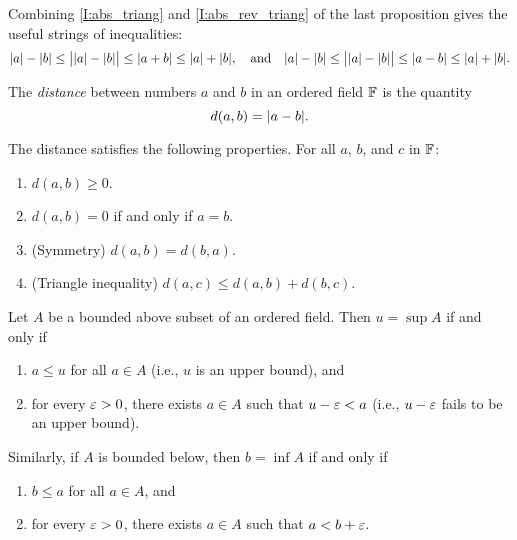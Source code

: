 \documentclass{book}
\begin{document}
\begin{rmk}
Combining \eqref{I:abs_triang} and \eqref{I:abs_rev_triang} of the last proposition gives the useful strings of inequalities:
\begin{equation}
	\lvert a\rvert - \lvert b\rvert \leq \big\lvert \lvert a\rvert - \lvert b\rvert\big\rvert \leq \lvert a + b\rvert \leq \lvert a\rvert + \lvert b\rvert, \quad \text{and}
	\quad \lvert a\rvert - \lvert b\rvert \leq \big\lvert \lvert a\rvert - \lvert b\rvert\big\rvert \leq \lvert a - b\rvert \leq \lvert a\rvert + \lvert b\rvert.
	\label{E:full_triangle}
\end{equation}
\end{rmk}

\begin{defn}
The {\em distance} between numbers $a$ and $b$ in an ordered field $\mathbb{F}$ is the quantity
\[
	d(a,b) = \lvert a - b\rvert.
\]
\label{D:distance_of}
\end{defn}

\begin{propstar}
The distance satisfies the following properties. For all $a$, $b$, and $c$ in $\mathbb{F}$:
\begin{enumerate}
\item $d(a,b) \geq 0$.
\item $d(a,b) = 0$ if and only if $a = b$. 
\item (Symmetry) $d(a,b) = d(b,a)$.
\item (Triangle inequality) $d(a,c) \leq d(a,b) + d(b,c)$.
\end{enumerate}
\label{P:distance_props_of}
\end{propstar}

\begin{lem}
Let $A$ be a bounded above subset of an ordered field. Then $u = \sup A$ if and only if 
\begin{enumerate}
\item  
$a \leq u$ for all $a \in A$ (i.e., $u$ is an upper bound), and
\item
for every $\varepsilon > 0$, there exists $a \in A$ such that $u - \varepsilon < a$ (i.e., $u - \varepsilon$ fails to be an upper bound).
\end{enumerate}
Similarly, if $A$ is bounded below, then $b = \inf A$ if and only if
\begin{enumerate}
\item  
$b \leq a$ for all $a \in A$, and 
\item
for every $\varepsilon > 0$, there exists $a \in A$ such that $a < b + \varepsilon$.
\end{enumerate}
\label{L:sup_inf_characterization}
\end{lem}
\end{document}
